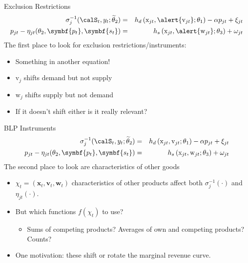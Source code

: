 \begin{frame}{Exclusion Restrictions}
\begin{eqnarray*}
    \sigma_j^{-1}(\calS_t,y_t;\widetilde{\theta}_2) &=&  h_d\left(\mathrm{x}_{jt}, \alert{\mathrm{v}_{jt}}; \theta_1 \right)  - \alpha p_{jt} + \xi_{jt}\\
    p_{jt} - \eta_{jt}(\theta_2,\symbf{p_t},\symbf{s_t}) &=&   h_s\left(\mathrm{x}_{jt},\alert{\mathrm{w}_{jt}};\theta_3 \right)+\omega_{jt}
\end{eqnarray*}
The first place to look for exclusion restrictions/instruments:
\begin{itemize}
\item Something in another equation!
\item $\mathrm{v}_j$ shifts demand but not supply
\item $\mathrm{w}_j$ shifts supply but not demand
\item If it doesn't shift either is it really relevant?
\end{itemize}
\end{frame}


\begin{frame}{BLP Instruments}
\begin{eqnarray*}
    \sigma_j^{-1}(\calS_t,y_t;\widetilde{\theta}_2) &=&  h_d\left(\mathrm{x}_{jt}, \mathrm{v}_{jt}; \theta_1 \right)  - \alpha p_{jt} + \xi_{jt}\\
    p_{jt} - \eta_{jt}(\theta_2,\symbf{p_t},\symbf{s_t}) &=&   h_s\left(\mathrm{x}_{jt},\mathrm{w}_{jt};\theta_3 \right)+\omega_{jt}
\end{eqnarray*}
The second place to look are characteristics of other goods
\begin{itemize}
\item $\chi_t = (\symbf{x}_{t},\symbf{v}_{t},\symbf{w}_{t})$ characteristics of other products affect both $\sigma_{j}^{-1}(\cdot)$ and $\eta_{jt}(\cdot)$.
\item But which functions $f(\chi_t)$ to use?
\begin{itemize}
\item Sums of competing products? Averages of own and competing products? Counts?
\end{itemize}
\item One motivation: these shift or rotate the \alert{marginal revenue curve}.
\end{itemize}
\end{frame}




